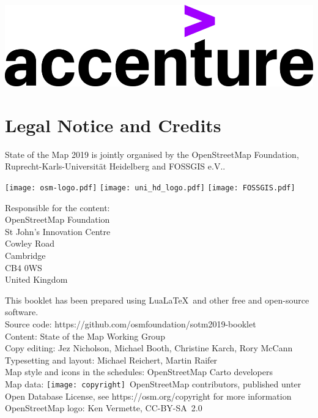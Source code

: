 \newpage
\pagestyle{cropmarksstyle}
\noindent
\vspace{10mm}
\begin{center}
  \includegraphics[width=0.8\linewidth]{sponsors/accenture.png}
\end{center}
\newpage
\null
\newpage

\section*{Legal Notice and Credits}
\label{legal}

\RaggedRight
State of the Map 2019 is jointly organised by the OpenStreetMap Foundation,
Ruprecht-Karls-Universität Heidelberg and FOSSGIS e.V..

\vspace{0.5em}
\newlength\logoHeight
\setlength{\logoHeight}{3.5\baselineskip}
\texttt{[image: osm-logo.pdf]}
\hfill
\texttt{[image: uni\_hd\_logo.pdf]}
\hfill
\texttt{[image: FOSSGIS.pdf]}

\vspace{0.5em}
\noindent Responsible for the content:\\
OpenStreetMap Foundation\\
St John’s Innovation Centre\\
Cowley Road\\
Cambridge\\
CB4 0WS\\
United Kingdom

\vspace{0.5em}
\noindent This booklet has been prepared using Lua\LaTeX\ and 
other free and open-source software.\\
Source code: https://github.com/osmfoundation/sotm2019-booklet\\
Content: State of the Map Working Group\\
Copy editing: Jez Nicholson, Michael Booth, Christine Karch, Rory McCann\\
Typesetting and layout: Michael Reichert, Martin Raifer\\
Map style and icons in the schedules: OpenStreetMap Carto developers\\
Map data: \texttt{[image: copyright]}~Open\-Street\-Map contributors, published unter Open Database License, see https://osm.org/copyright for more information\\
OpenStreetMap logo: Ken Vermette, CC-BY-SA~2.0

